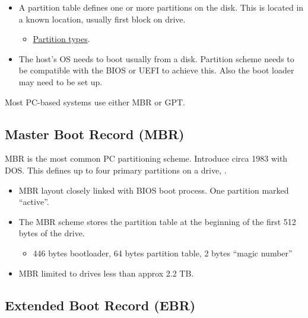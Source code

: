 \begin{itemize}
\item
  A partition table defines one or more partitions on the disk. This is
  located in a known location, usually first block on drive.

  \begin{itemize}
  
  \item
    \href{https://en.wikipedia.org/wiki/Partition_type}{Partition
    types}.
  \end{itemize}
\item
  The host's OS needs to boot usually from a disk. Partition scheme
  needs to be compatible with the BIOS or UEFI to achieve this. Also the
  boot loader may need to be set up.
\end{itemize}

Most PC-based systems use either MBR or GPT.

\subsection{Master Boot Record (MBR)}
\label{sec:master-boot-record-mbr}

MBR is the most common PC partitioning scheme. Introduce circa 1983 with
DOS. This defines up to four primary partitions on a drive, .


\begin{itemize}
\item
  MBR layout closely linked with BIOS boot process. One partition marked
  ``active''.
\item
  The MBR scheme stores the partition table at the beginning of the
  first 512 bytes of the drive.

  \begin{itemize}
  
  \item
    446 bytes bootloader, 64 bytes partition table, 2 bytes ``magic
    number''
  \end{itemize}
\item
  MBR limited to drives less than approx 2.2 TB.
\end{itemize}

\subsection{Extended Boot Record (EBR)}
\label{sec:extended-boot-record}

